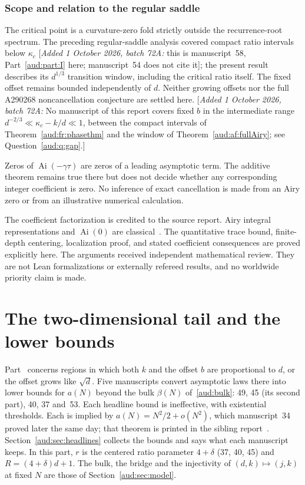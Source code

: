 \documentclass[11pt,a4paper]{article}
\numberwithin{equation}{section}
\newcommand{\Ai}{\operatorname{Ai}}
\newcommand{\addednote}[1]{{\small[\textit{Added 1 October 2026, batch 72A:} #1]}}
\begin{document}
\section{Scope and relation to the regular saddle}
The critical point is a curvature-zero fold strictly outside the recurrence-root spectrum. The preceding regular-saddle analysis covered compact ratio intervals below $\kappa_c$ \addednote{this is manuscript~58, Part~\ref{aud:part:I} here; manuscript~54 does not cite it}; the present result describes its $d^{1/3}$ transition window, including the critical ratio itself. The fixed offset remains bounded independently of $d$. Neither growing offsets nor the full A290268 noncancellation conjecture are settled here. \addednote{No manuscript of this report covers fixed $b$ in the intermediate range $d^{-2/3}\ll\kappa_c-k/d\ll1$, between the compact intervals of Theorem~\ref{aud:fr:phasethm} and the window of Theorem~\ref{aud:af:fullAiry}; see Question~\ref{aud:q:gap}.}

Zeros of $\Ai(-\gamma\tau)$ are zeros of a leading asymptotic term. The additive theorem remains true there but does not decide whether any corresponding integer coefficient is zero. No inference of exact cancellation is made from an Airy zero or from an illustrative numerical calculation.

The coefficient factorization is credited to the source report. Airy integral representations and $\Ai(0)$ are classical~\cite{dlmf-airy}. The quantitative trace bound, finite-depth centering, localization proof, and stated coefficient consequences are proved explicitly here. The arguments received independent mathematical review. They are not Lean formalizations or externally refereed results, and no worldwide priority claim is made.
\part{The two-dimensional tail and the lower bounds}\label{aud:part:III}
Part~\ref{aud:part:III} concerns regions in which both $k$ and the offset $b$ are proportional to $d$, or the offset grows like $\sqrt d$. Five manuscripts convert asymptotic laws there into lower bounds for $a(N)$ beyond the bulk $\beta(N)$ of~\eqref{aud:bulk}: 49, 45 (its second part), 40, 37 and~53. Each headline bound is ineffective, with existential thresholds. Each is implied by $a(N)=N^2/2+o(N^2)$, which manuscript~34 proved later the same day; that theorem is printed in the sibling report~\cite{pte}. Section~\ref{aud:sec:headlines} collects the bounds and says what each manuscript keeps. In this part, $r$ is the centered ratio parameter $4+\delta$ (37, 40, 45) and $R=(4+\delta)d+1$. The bulk, the bridge and the injectivity of $(d,k)\mapsto(j,k)$ at fixed $N$ are those of Section~\ref{aud:sec:model}.
\end{document}
